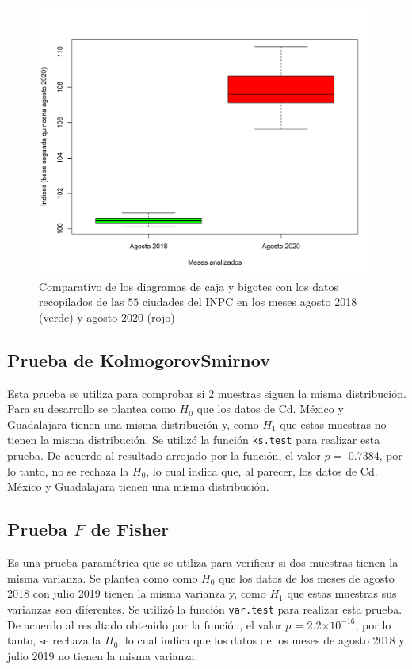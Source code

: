 \documentclass{article}
\begin{document}
\begin{figure}
\centering
\includegraphics[scale=0.55]{Figures/comparativosT.png}
\caption{Comparativo de los diagramas de caja y bigotes con los  datos recopilados de las $55$ ciudades del INPC en los meses agosto 2018 (verde) y agosto 2020 (rojo)}
\label{comparativosT}
\end{figure}

\subsection{Prueba de Kolmogorov\textendash Smirnov}
    
Esta prueba se utiliza para comprobar si 2 muestras siguen la misma distribución. Para su desarrollo se plantea como $H_{0}$ que los datos de Cd. México y Guadalajara tienen una misma distribución y, como $H_{1}$ que estas muestras no tienen la misma distribución. Se utilizó la función \texttt{ks.test} para realizar esta prueba. De acuerdo al resultado arrojado por la función, el valor $p =$ 0.7384, por lo tanto, no se rechaza la $H_{0}$, lo cual indica que, al parecer, los datos de Cd. México y Guadalajara tienen una misma distribución.
    
    
\subsection{Prueba $F$ de Fisher}
    
Es una prueba paramétrica que se utiliza para verificar si dos muestras tienen la misma varianza. Se plantea como como $H_{0}$ que los datos de los meses de agosto 2018 con julio 2019 tienen la misma varianza y, como $H_{1}$ que estas muestras sus varianzas son diferentes. Se utilizó la función \texttt{var.test} para realizar esta prueba. De acuerdo al resultado obtenido por la función, el valor $p$ = 2.2$\times 10^{-16}$, por lo tanto, se rechaza la $H_{0}$, lo cual indica que los datos de los meses de agosto 2018 y julio 2019 no tienen la misma varianza. 
    
\end{document}
